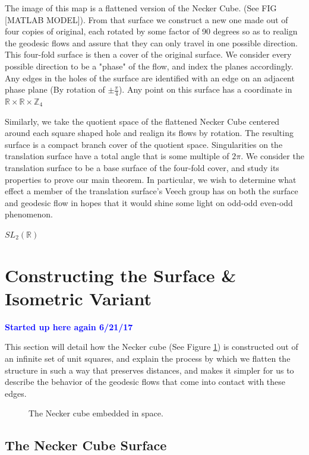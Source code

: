 \documentclass[]{article}
\newcommand{\compav}[1]{\textbf{\textcolor{blue}{#1}}}
\begin{document}
The image of this map is a flattened version of the Necker Cube. (See FIG [MATLAB MODEL]). From that surface we construct a new one made out of four copies of original, each rotated by some factor of 90 degrees so as to realign the geodesic flows and assure that they can only travel in one possible direction. This four-fold surface is then a cover of the original surface. We consider every possible direction to be a "phase" of the flow, and index the planes accordingly. Any edges in the holes of the surface are identified with an edge on an adjacent phase plane (By rotation of $\pm \frac{\pi}{4}$). Any point on this surface has a coordinate in $\mathbb{R}\times\mathbb{R}\times\mathbb{Z}_{4} $

Similarly, we take the quotient space of the flattened Necker Cube centered around each square shaped hole and realign its flows by rotation. The resulting surface is a compact branch cover of the quotient space. Singularities on the translation surface have a total angle that is some multiple of $2\pi$. We consider the translation surface to be a base surface of the four-fold cover, and study its properties to prove our main theorem. In particular, we wish to determine what effect a member of the translation surface's Veech group has on both the surface and geodesic flow in hopes that it would shine some light on odd-odd even-odd phenomenon.



 $SL_{2}(\mathbb{R})$

\section{Constructing the Surface \& Isometric Variant}
\compav{Started up here again 6/21/17}

This section will detail how the Necker cube (See Figure \ref{fig:cubexyz}) is constructed out of an infinite set of unit squares, and explain the process by which we flatten the structure in such a way that preserves distances, and makes it simpler for us to describe the behavior of the geodesic flows that come into contact with these edges.

\begin{figure}[H]
\begin{center}

\caption{The Necker cube embedded in space.}
\label{fig:cubexyz}
\end{center}
\end{figure}

\subsection{The Necker Cube Surface}
\end{document}
